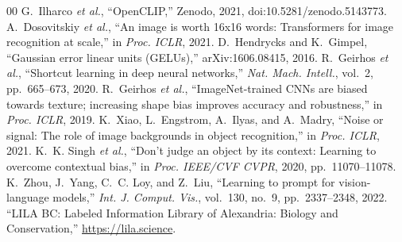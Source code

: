 \documentclass[conference]{IEEEtran}
\begin{document}
\begin{thebibliography}{00}
 G.~Ilharco \emph{et al.}, ``OpenCLIP,'' Zenodo, 2021, doi:10.5281/zenodo.5143773.
 A.~Dosovitskiy \emph{et al.}, ``An image is worth 16x16 words: Transformers for image recognition at scale,'' in \emph{Proc. ICLR}, 2021.
 D.~Hendrycks and K.~Gimpel, ``Gaussian error linear units (GELUs),'' arXiv:1606.08415, 2016.
 R.~Geirhos \emph{et al.}, ``Shortcut learning in deep neural networks,'' \emph{Nat. Mach. Intell.}, vol.~2, pp.~665--673, 2020.
 R.~Geirhos \emph{et al.}, ``ImageNet-trained CNNs are biased towards texture; increasing shape bias improves accuracy and robustness,'' in \emph{Proc. ICLR}, 2019.
 K.~Xiao, L.~Engstrom, A.~Ilyas, and A.~Madry, ``Noise or signal: The role of image backgrounds in object recognition,'' in \emph{Proc. ICLR}, 2021.
 K.~K. Singh \emph{et al.}, ``Don't judge an object by its context: Learning to overcome contextual bias,'' in \emph{Proc. IEEE/CVF CVPR}, 2020, pp.~11070--11078.
 K.~Zhou, J.~Yang, C.~C. Loy, and Z.~Liu, ``Learning to prompt for vision-language models,'' \emph{Int. J. Comput. Vis.}, vol.~130, no.~9, pp.~2337--2348, 2022.
 ``LILA BC: Labeled Information Library of Alexandria: Biology and Conservation,'' \url{https://lila.science}.
\end{thebibliography}
\end{document}
